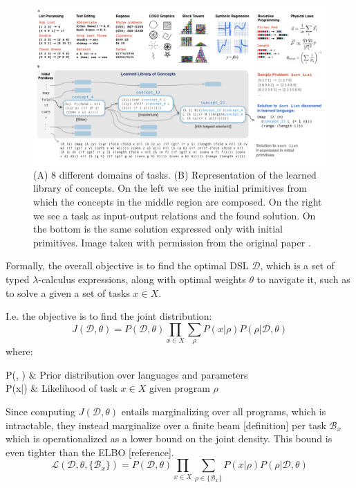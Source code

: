 \begin{figure}
\includegraphics[width=\textwidth]{../img/conc_library.png}
\caption{(A) 8 different domains of tasks. (B) Representation of the learned library of concepts. On the left we see the initial primitives from which the concepts in the middle region are composed. On the right we see a task as input-output relations and the found solution. On the bottom is the same solution expressed only with initial primitives. Image taken with permission from the original paper \cite{ellis_dreamcoder_2021}.}
\label{fig:conc_library}
\end{figure}



Formally, the overall objective is to find the optimal DSL \(\mathcal{D}\), which is a set of typed \(\lambda\)-calculus expressions, along with optimal weights \( \theta \) to navigate it, such as to solve a given a set of tasks \(x \in X\).

I.e. the objective is to find the joint distribution:
\[ 
    J(\mathcal{D}, \theta) = P(\mathcal{D}, \theta) \prod_{x \in X} \sum_{\rho} P(x|\rho)P(\rho|\mathcal{D},\theta) 
\]
where:
\begin{conditions*}
    P(, \theta) & Prior distribution over languages and parameters \\
    P(x|\rho) & Likelihood of task \(x \in X\) given program \(\rho\)
\end{conditions*}

Since computing \( J(\mathcal{D}, \theta) \) entails marginalizing over all programs, which is intractable, they instead marginalize over a finite beam [definition] per task \( {\mathcal{B}_x} \) which is operationalized as a lower bound on the joint density. This bound is even tighter than the ELBO [reference].
\[
    \mathcal{L}(\mathcal{D}, \theta, \{\mathcal{B}_x\}) = P(\mathcal{D}, \theta) \prod_{x \in X} \sum_{\rho \in \{\mathcal{B}_x\}} P(x|\rho)P(\rho|\mathcal{D},\theta)
\]

